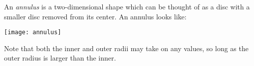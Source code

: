 \documentclass[12pt]{article}
\begin{document}
An \emph{annulus} is a two-dimensional shape which can be thought of as a disc with a smaller disc removed from its center.  An annulus looks like:

\begin{center}
\texttt{[image: annulus]}
\end{center}

Note that both the inner and outer radii may take on any values, so long as the outer radius is larger than the inner.
\end{document}

